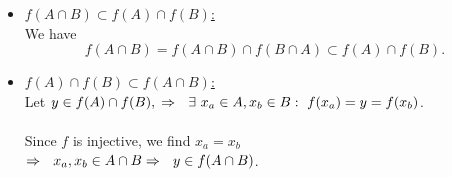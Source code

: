 {\color{solution}
\begin{itemize}
	\item 
	\underline{$f(A \cap B) \subset f(A) \cap f(B)$:}\\
	We have
	$$
	f(A \cap B) = f(A \cap B) \cap f(B \cap A) \subset f(A) \cap f(B).
	$$
	\item 
	\underline{$f(A) \cap f(B) \subset f(A \cap B) $:}\\
	Let $y \in f(A) \cap f(B),\\
	\Rightarrow~~\exists~x_a\in A,x_b\in B:~f(x_a)=y=f(x_b)$.\\~\\
	Since $f$ is injective, we find $x_a=x_b$\\
	$\Rightarrow~~x_a,x_b\in A\cap B\\
	\Rightarrow~~y\in f(A\cap B)$.\\
\end{itemize}
}